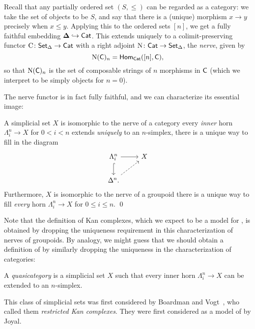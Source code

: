 \documentclass[a4paper,11pt]{article}
\begin{document}
\begin{defn}
  Recall that any partially ordered set $(S, \leq)$ can be regarded as
  a category: we take the set of objects to be $S$, and say that there
  is a (unique) morphism $x \to y$ precisely when $x \leq y$. Applying
  this to the ordered sets $[n]$, we get a fully faithful embedding
  $\boldsymbol{\Delta} \hookrightarrow \textup{\textsf{Cat}}$. This extends uniquely to a
  colimit-preserving functor $\Ccat \colon \sSet \to \Cat$ with a
  right adjoint $\Nrv \colon \Cat \to \sSet$, the \emph{nerve}, given
  by
  \[ \mathrm{N}(\textup{\textsf{C}})_{n} = \textup{\textsf{Hom}}_{\textup{\textsf{Cat}}}([n], \textup{\textsf{C}}),\] so that $\mathrm{N}(\textup{\textsf{C}})_{n}$
  is the set of composable strings of $n$ morphisms in $\textup{\textsf{C}}$ (which we
  interpret to be simply objects for $n = 0$).
\end{defn}
The nerve functor is in fact fully faithful, and we can characterize
its essential image:
\begin{propn}
  A simplicial set $X$ is isomorphic to the nerve of a category \IFF{}
  every \emph{inner} horn $\Lambda^{n}_{i} \to X$ for
  $0 < i < n$ extends \emph{uniquely} to an $n$-simplex, \ie{} there
  is a unique way to fill in the diagram
  \[
    \begin{tikzcd}
      \Lambda^{n}_{i} \arrow{r} \arrow[hookrightarrow]{d} & X  \\
      \Delta^{n}. \arrow[dashed]{ur}
    \end{tikzcd}
  \]
  Furthermore, $X$ is isomorphic to the nerve of a groupoid \IFF{}
  there is a unique way to fill \emph{every} horn
  $\Lambda^{n}_{i} \to X$ for $0 \leq i \leq n$. \qed
\end{propn}
Note that the definition of Kan complexes, which we expect to be a
model for \igpds{}, is obtained by dropping the uniqueness requirement
in this characterization of nerves of groupoids. By analogy, we might
guess that we should obtain a definition of \icats{} by similarly
dropping the uniqueness in the characterization of categories:
\begin{defn}
  A \emph{quasicategory} is a simplicial set $X$ such that every inner
  horn $\Lambda^{n}_{i} \to X$ can be extended to an $n$-simplex.
\end{defn}

\begin{remark}
  This class of simplicial sets was first considered by Boardman and
  Vogt~\cite{BoardmanVogt}, who called them \emph{restricted Kan
    complexes}. They were first considered as a model of \icats{} by
  Joyal.
\end{remark}
\end{document}
